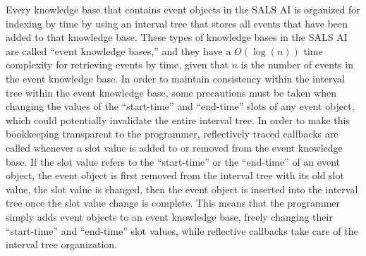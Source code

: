 Every knowledge base that contains event objects in the SALS AI is
organized for indexing by time by using an interval tree that stores
all events that have been added to that knowledge base.  These types
of knowledge bases in the SALS AI are called ``event knowledge
bases,'' and they have a $O(\log{(n)})$ time complexity for retrieving
events by time, given that $n$ is the number of events in the event
knowledge base.  In order to maintain consistency within the interval
tree within the event knowledge base, some precautions must be taken
when changing the values of the ``start-time'' and ``end-time'' slots
of any event object, which could potentially invalidate the entire
interval tree.  In order to make this bookkeeping transparent to the
programmer, reflectively traced callbacks are called whenever a slot
value is added to or removed from the event knowledge base.  If the
slot value refers to the ``start-time'' or the ``end-time'' of an
event object, the event object is first removed from the interval tree
with its old slot value, the slot value is changed, then the event
object is inserted into the interval tree once the slot value change
is complete.  This means that the programmer simply adds event objects
to an event knowledge base, freely changing their ``start-time'' and
``end-time'' slot values, while reflective callbacks take care of the
interval tree organization.

